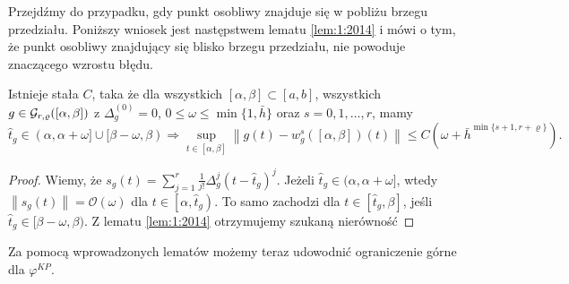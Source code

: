 \documentclass[oik, pdftex, man]{mgrwms}
\begin{document}
    Przejdźmy do przypadku, gdy punkt osobliwy znajduje się w pobliżu brzegu przedziału. Poniższy wniosek jest następstwem lematu \ref{lem:1:2014} i mówi o tym, że punkt osobliwy znajdujący się blisko brzegu przedziału, nie powoduje znaczącego wzrostu błędu.

    \begin{cor} \label{cor:1}
        Istnieje stała $C$, taka że dla wszystkich $[\alpha, \beta] \subset [a, b]$, wszystkich $g \in \mathcal{G}_{r,\varrho}([\alpha,\beta])$ z $\Delta_{g}^{(0)} = 0$, $0 \leq \omega \leq \min \{1, \bar{h}\}$ oraz $s=0,1,\dots,r$, mamy
        \begin{equation*}
            \hat{t}_{g} \in(\alpha, \alpha+\omega] \cup[\beta-\omega, \beta) \Longrightarrow  \sup_{t \in[\alpha, \beta]}\left\|g(t)-w_{g}^{s}([\alpha, \beta])(t)\right\| \leq C\left(\omega+\bar{h}^{\min \{s+1, r+\varrho\}}\right).
        \end{equation*}
    \end{cor}
    \begin{proof}
        Wiemy, że $s_{g}(t)=\sum_{j=1}^{r} \frac{1}{j !} \Delta_{g}^{j}\left(t-\hat{t}_{g}\right)^{j}$. Jeżeli $\hat{t}_{g} \in(\alpha, \alpha+\omega]$, wtedy $\left\|s_{g}(t)\right\|=\mathcal{O}(\omega)$ dla $t \in\left[\alpha, \hat{t}_{g}\right) .$ To samo zachodzi dla $t \in\left[\hat{t}_{g}, \beta\right]$, jeśli $\hat{t}_{g} \in[\beta-\omega, \beta)$. Z lematu \ref{lem:1:2014} otrzymujemy szukaną nierówność
    \end{proof}

    Za pomocą wprowadzonych lematów możemy teraz udowodnić ograniczenie górne dla $\varphi^{KP}$.
\end{document}
